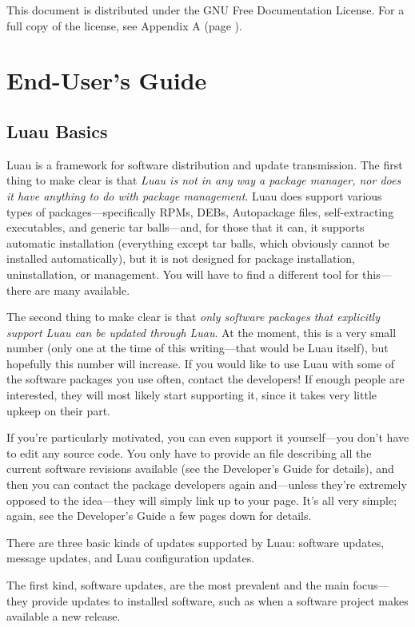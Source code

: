 \documentclass{report}
\begin{document}
This document is distributed under the GNU Free Documentation License.  For a full copy of the license, see Appendix A (page \pageref{sec:appendixa}).

\chapter{End-User's Guide}

\section{Luau Basics}
\label{sec:basics}

Luau is a framework for software distribution and update transmission.  The first thing to make clear is that \emph{Luau is not in any way a package manager, nor does it have anything to do with package management}.  Luau does support various types of packages---specifically RPMs, DEBs, Autopackage files, self-extracting executables, and generic tar balls---and, for those that it can, it supports automatic installation (everything except tar balls, which obviously cannot be installed automatically), but it is not designed for package installation, uninstallation, or management.  You will have to find a different tool for this---there are many available.

The second thing to make clear is that \emph{only software packages that explicitly support Luau can be updated through Luau}.  At the moment, this is a very small number (only one at the time of this writing---that would be Luau itself), but hopefully this number will increase.  If you would like to use Luau with some of the software packages you use often, contact the developers!  If enough people are interested, they will most likely start supporting it, since it takes very little upkeep on their part.

If you're particularly motivated, you can even support it yourself---you don't have to edit any source code.  You only have to provide an file describing all the current software revisions available (see the Developer's Guide for details), and then you can contact the package developers again and---unless they're extremely opposed to the idea---they will simply link up to your page.  It's all very simple; again, see the Developer's Guide a few pages down for details.

There are three basic kinds of updates supported by Luau: software updates, message updates, and Luau configuration updates.

The first kind, software updates, are the most prevalent and the main focus---they provide updates to installed software, such as when a software project makes available a new release.
\end{document}
